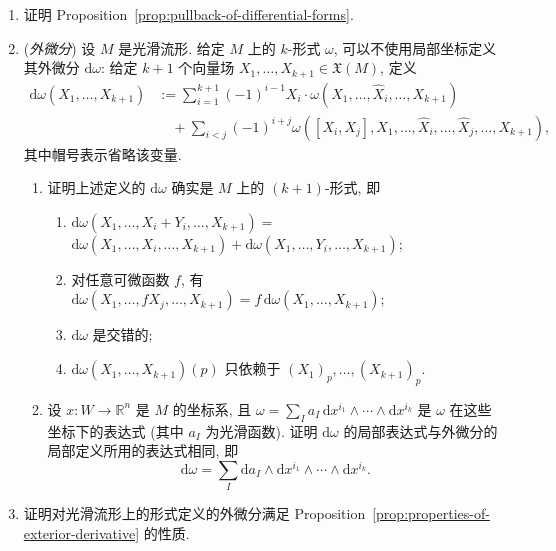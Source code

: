 \begin{RiemannExercise}\label{ex:differential-forms}
\begin{enumerate}[label=(\arabic*),ref=\arabic*,leftmargin=*]
\item\label{ex:prove-pullback-of-differential-forms} 证明 Proposition~\ref{prop:pullback-of-differential-forms}.
\item\label{ex:intrinsic-exterior-derivative} (\emph{外微分}) 设 $M$ 是光滑流形. 给定 $M$ 上的 $k$-形式 $\omega$, 可以不使用局部坐标定义其外微分 $\mathrm{d}\omega$: 给定 $k+1$ 个向量场 $X_1,\ldots,X_{k+1}\in\mathfrak{X}(M)$, 定义
\begin{align*}
  \mathrm{d}\omega(X_1,\ldots,X_{k+1})
  &:=\sum_{i=1}^{k+1}(-1)^{i-1}X_i\cdot\omega(X_1,\ldots,\widehat X_i,\ldots,X_{k+1})\\
  &\quad+\sum_{i<j}(-1)^{i+j}\omega([X_i,X_j],X_1,\ldots,\widehat X_i,\ldots,\widehat X_j,\ldots,X_{k+1}),
\end{align*}
其中帽号表示省略该变量.
\begin{enumerate}[label=(\alph*),leftmargin=*]
\item 证明上述定义的 $\mathrm{d}\omega$ 确实是 $M$ 上的 $(k+1)$-形式, 即
\begin{enumerate}[label=(\roman*),leftmargin=*]
\item $\mathrm{d}\omega(X_1,\ldots,X_i+Y_i,\ldots,X_{k+1})={}$\\
$\mathrm{d}\omega(X_1,\ldots,X_i,\ldots,X_{k+1})+\mathrm{d}\omega(X_1,\ldots,Y_i,\ldots,X_{k+1})$;
\item 对任意可微函数 $f$, 有 $\mathrm{d}\omega(X_1,\ldots,fX_j,\ldots,X_{k+1})=f\,\mathrm{d}\omega(X_1,\ldots,X_{k+1})$;
\item $\mathrm{d}\omega$ 是交错的;
\item $\mathrm{d}\omega(X_1,\ldots,X_{k+1})(p)$ 只依赖于 $(X_1)_p,\ldots,(X_{k+1})_p$.
\end{enumerate}
\item 设 $x:W\to\mathbb{R}^n$ 是 $M$ 的坐标系, 且 $\omega=\sum_Ia_I\,\mathrm{d}x^{i_1}\wedge\cdots\wedge\mathrm{d}x^{i_k}$ 是 $\omega$ 在这些坐标下的表达式 (其中 $a_I$ 为光滑函数). 证明 $\mathrm{d}\omega$ 的局部表达式与外微分的局部定义所用的表达式相同, 即
\[
  \mathrm{d}\omega=\sum_I\mathrm{d}a_I\wedge\mathrm{d}x^{i_1}\wedge\cdots\wedge\mathrm{d}x^{i_k}.
\]
\end{enumerate}
\item\label{ex:properties-of-exterior-derivative-on-manifolds} 证明对光滑流形上的形式定义的外微分满足 Proposition~\ref{prop:properties-of-exterior-derivative} 的性质.

\end{enumerate}
\end{RiemannExercise}
